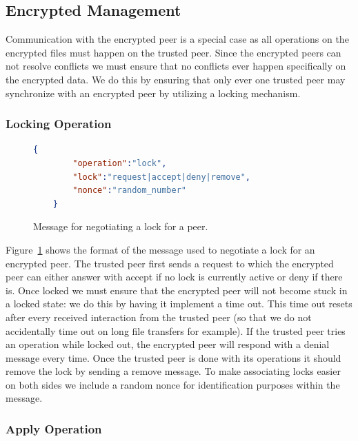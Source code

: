 \subsection{Encrypted Management}
\label{sub:Encrypted Management}

Communication with the encrypted peer is a special case as all operations on the encrypted files must happen on the trusted peer.
Since the encrypted peers can not resolve conflicts we must ensure that no conflicts ever happen specifically on the encrypted data.
We do this by ensuring that only ever one trusted peer may synchronize with an encrypted peer by utilizing a locking mechanism.

\subsubsection{Locking Operation}
\label{subs:Locking Operation}

\begin{figure}[htp]
    \begin{lstlisting}[language=json,firstnumber=0]
    {
        "operation":"lock",
        "lock":"request|accept|deny|remove",
        "nonce":"random_number"
    }
    \end{lstlisting}
\caption[Lock Peer Message]{Message for negotiating a lock for a peer.}
\label{json:lock_peer}
\end{figure}

Figure~\ref{json:lock_peer} shows the format of the message used to negotiate a lock for an encrypted peer.
The trusted peer first sends a request to which the encrypted peer can either answer with accept if no lock is currently active or deny if there is.
Once locked we must ensure that the encrypted peer will not become stuck in a locked state: we do this by having it implement a time out.
This time out resets after every received interaction from the trusted peer (so that we do not accidentally time out on long file transfers for example).
If the trusted peer tries an operation while locked out, the encrypted peer will respond with a denial message every time.
Once the trusted peer is done with its operations it should remove the lock by sending a remove message.
To make associating locks easier on both sides we include a random nonce for identification purposes within the message.

\subsubsection{Apply Operation}
\label{subs:Apply Operation}

